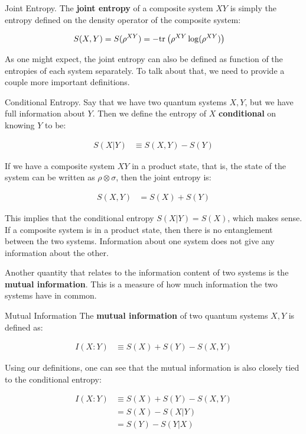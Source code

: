 \begin{definition}{Joint Entropy.}
    The \textbf{joint entropy} of a composite system $XY$ is simply the entropy defined on the density operator of the composite system:
    
    \begin{align}
        S(X,Y) = S(\rho^{XY}) &= -\text{tr}_{}\left( {\rho^{XY} \log(\rho^{XY})} \right)
    \end{align}
\end{definition}

As one might expect, the joint entropy can also be defined as function of the entropies of each system separately. To talk about that, we need to provide a couple more important definitions.

\begin{definition}{Conditional Entropy.}
    Say that we have two quantum systems $X,Y$, but we have full information about $Y$. Then we define the entropy of $X$ \textbf{conditional} on knowing $Y$ to be: 
    
    \begin{align}
        S(X|Y) &\equiv S(X,Y) - S(Y)
    \end{align}
\end{definition}

\begin{example}
    If we have a composite system $XY$ in a product state, that is, the state of the system can be written as $\rho \otimes \sigma$, then the joint entropy is:
\end{example}

\begin{align}
    S(X,Y) &= S(X) + S(Y)
\end{align}

This implies that the conditional entropy $S(X|Y) = S(X)$, which makes sense. If a composite system is in a product state, then there is no entanglement between the two systems. Information about one system does not give any information about the other.

Another quantity that relates to the information content of two systems is the \textbf{mutual information}. This is a measure of how much information the two systems have in common.

\begin{definition}{Mutual Information}
    The \textbf{mutual information} of two quantum systems $X,Y$ is defined as:
    
    \begin{align}
        I(X:Y) &\equiv S(X) + S(Y) - S(X,Y)
    \end{align}
\end{definition}

Using our definitions, one can see that the mutual information is also closely tied to the conditional entropy:

\begin{align}
        I(X:Y) &\equiv S(X) + S(Y) - S(X,Y) \\ 
        &= S(X) - S(X|Y) \\ 
        &= S(Y) - S(Y|X)
\end{align}
